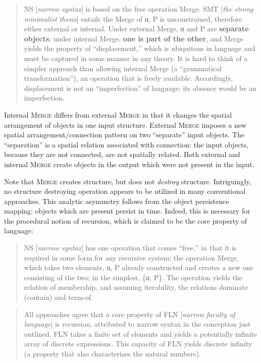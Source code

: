 \begin{quote}
NS [\textit{narrow syntax}] is based on the free operation Merge. SMT [\textit{the strong minimalist thesis}] entails the Merge of α, P is unconstrained, therefore either external or internal. Under external Merge, α and P are \textbf{separate objects}; under internal Merge, \textbf{one is part of the other}, and Merge yields the property of “displacement,” which is ubiquitous in language and must be captured in some manner in any theory. It is hard to think of a simpler approach than allowing internal Merge (a “grammatical transformation”), an operation that is freely available. Accordingly, displacement is not an “imperfection” of language; its absence would be an imperfection. \citep{Chomsky2001b}
\end{quote}

  Internal \textsc{Merge} differs from external \textsc{Merge} in that it changes the spatial arrangement of objects in one input structure. External \textsc{Merge} imposes a new spatial arrangement/connection pattern on two “separate” input objects. The “separation” is a spatial relation associated with connection: the input objects, because they are not connected, are not spatially related. Both external and internal \textsc{Merge} create objects in the output which were not present in the input. 

  Note that \textsc{Merge} creates structure, but does not \textit{destroy} structure. Intriguingly, no structure destroying operation appears to be utilized in many conventional approaches. This analytic asymmetry follows from the object persistence mapping: objects which are present persist in time. Indeed, this is necessary for the procedural notion of recursion, which is claimed to be the core property of language:

\begin{quote}
NS [\textit{narrow syntax}] has one operation that comes “free,” in that it is required in some form for any recursive system: the operation Merge, which takes two elements, α, P already constructed and creates a new one consisting of the two; in the simplest, \{α, P\}. The operation yields the relation of membership, and assuming iterability, the relations dominate (contain) and term-of. \citep{Chomsky2001b}
\end{quote}

\begin{quote}
All approaches agree that a core property of FLN [\textit{narrow faculty of language}] is recursion, attributed to narrow syntax in the conception just outlined. FLN takes a finite set of elements and yields a potentially infinite array of discrete expressions. This capacity of FLN yields discrete infinity (a property that also characterizes the natural numbers). \citep{HauserEtAl2002}
\end{quote}

